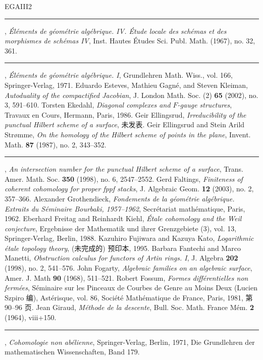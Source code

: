 \begin{thebibliography}{EGAIII2}
 \rule{2em}{.3pt}, \emph{Éléments de géométrie algébrique. IV. Étude locale des schémas et des morphismes de schémas IV}, Inst. Hautes Études Sci. Publ. Math. (1967), no. 32, 361.
 \rule{2em}{.3pt}, \emph{Éléments de géométrie algébrique. I}, Grundlehren Math. Wiss., vol. 166, Springer-Verlag, 1971.
 Eduardo Esteves, Mathieu Gagné, and Steven Kleiman, \emph{Autoduality of the compactified Jacobian}, J. London Math. Soc. (2) \textbf{65} (2002), no. 3, 591--610.
 Torsten Ekedahl, \emph{Diagonal complexes and $F$-gauge structures}, Travaux en Cours, Hermann, Paris, 1986.
 Geir Ellingsrud, \emph{Irreducibility of the punctual Hilbert scheme of a surface}, 未发表.
 Geir Ellingsrud and Stein Arild Strømme, \emph{On the homology of the Hilbert scheme of points in the plane}, Invent. Math. \textbf{87} (1987), no. 2, 343--352.
 \rule{2em}{.3pt}, \emph{An intersection number for the punctual Hilbert scheme of a surface}, Trans. Amer. Math. Soc. \textbf{350} (1998), no. 6, 2547--2552.
 Gerd Faltings, \emph{Finiteness of coherent cohomology for proper fppf stacks}, J. Algebraic Geom. \textbf{12} (2003), no. 2, 357--366.
 Alexander Grothendieck, \emph{Fondements de la géométrie algébrique. Extraits du Séminaire Bourbaki, 1957--1962}, Secrétariat mathématique, Paris, 1962.
 Eberhard Freitag and Reinhardt Kiehl, \emph{Étale cohomology and the Weil conjecture}, Ergebnisse der Mathematik und ihrer Grenzgebiete (3), vol. 13, Springer-Verlag, Berlin, 1988.
 Kazuhiro Fujiwara and Kazuya Kato, \emph{Logarithmic étale topology theory}, (未完成的) 预印本, 1995.
 Barbara Fantechi and Marco Manetti, \emph{Obstruction calculus for functors of Artin rings. I}, J. Algebra \textbf{202} (1998), no. 2, 541--576.
 John Fogarty, \emph{Algebraic families on an algebraic surface}, Amer. J. Math \textbf{90} (1968), 511--521.
 Robert Fossum, \emph{Formes différentielles non fermées}, Séminaire sur les Pinceaux de Courbes de Genre au Moins Deux (Lucien Szpiro 编), Astérisque, vol. 86, Société Mathématique de France, Paris, 1981, 第 90--96 页.
 Jean Giraud, \emph{Méthode de la descente}, Bull. Soc. Math. France Mém. \textbf{2} (1964), viii+150.
 \rule{2em}{.3pt}, \emph{Cohomologie non abélienne}, Springer-Verlag, Berlin, 1971, Die Grundlehren der mathematischen Wissenschaften, Band 179.

\end{thebibliography}
